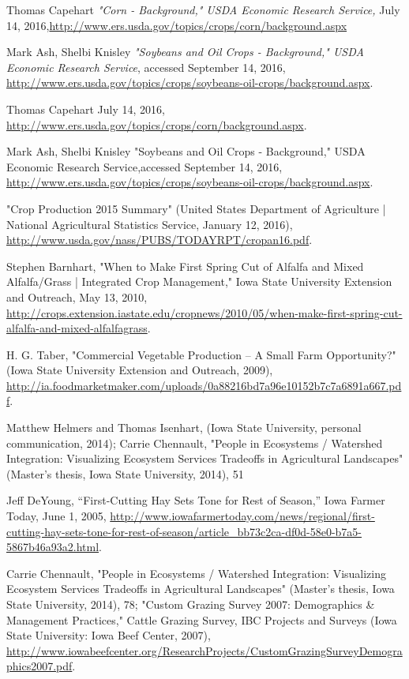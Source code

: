 \documentclass[11pt]{article}
\begin{document}
\begin{thebibliography}{1}

   Thomas Capehart {\em "Corn - Background," USDA Economic Research Service, }July 14, 2016,\url{http://www.ers.usda.gov/topics/crops/corn/background.aspx}

    Mark Ash, Shelbi Knisley {\em "Soybeans and Oil Crops - Background," USDA Economic Research Service}, accessed September 14, 2016, \url{http://www.ers.usda.gov/topics/crops/soybeans-oil-crops/background.aspx}.

   Thomas Capehart July 14, 2016, \url{http://www.ers.usda.gov/topics/crops/corn/background.aspx}.

  Mark Ash, Shelbi Knisley  "Soybeans and Oil Crops - Background," USDA Economic Research Service,accessed September 14, 2016, \url{http://www.ers.usda.gov/topics/crops/soybeans-oil-crops/background.aspx}.
  
  "Crop Production 2015 Summary" (United States Department of Agriculture | National Agricultural Statistics Service, January 12, 2016), \url{http://www.usda.gov/nass/PUBS/TODAYRPT/cropan16.pdf}.
  
  Stephen Barnhart, "When to Make First Spring Cut of Alfalfa and Mixed Alfalfa/Grass | Integrated Crop Management," Iowa State University Extension and Outreach, May 13, 2010, \url{http://crops.extension.iastate.edu/cropnews/2010/05/when-make-first-spring-cut-alfalfa-and-mixed-alfalfagrass}.
  
  H. G. Taber, "Commercial Vegetable Production – A Small Farm Opportunity?" (Iowa State University Extension and Outreach, 2009), \url{http://ia.foodmarketmaker.com/uploads/0a88216bd7a96e10152b7c7a6891a667.pdf}.
  
  Matthew Helmers and Thomas Isenhart, (Iowa State University, personal communication, 2014); Carrie Chennault, "People in Ecosystems / Watershed Integration: Visualizing Ecosystem Services Tradeoffs in Agricultural Landscapes" (Master’s thesis, Iowa State University, 2014), 51
  
  Jeff DeYoung, “First-Cutting Hay Sets Tone for Rest of Season,” Iowa Farmer Today, June 1, 2005, \url{http://www.iowafarmertoday.com/news/regional/first-cutting-hay-sets-tone-for-rest-of-season/article_bb73c2ca-df0d-58e0-b7a5-5867b46a93a2.html}.
  
Carrie Chennault, "People in Ecosystems / Watershed Integration: Visualizing Ecosystem Services Tradeoffs in Agricultural Landscapes" (Master’s thesis, Iowa State University, 2014), 78; "Custom Grazing Survey 2007: Demographics \& Management Practices," Cattle Grazing Survey, IBC Projects and Surveys (Iowa State University: Iowa Beef Center, 2007), \url{http://www.iowabeefcenter.org/ResearchProjects/CustomGrazingSurveyDemographics2007.pdf}.
  

\end{thebibliography}
\end{document}
